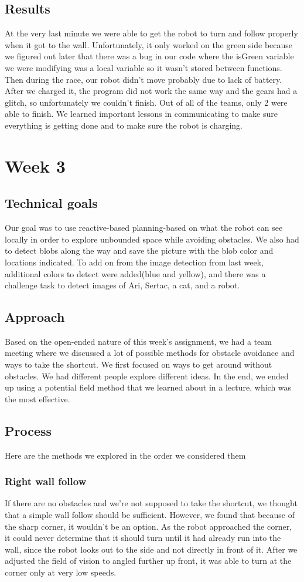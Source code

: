 \documentclass[journal, a4paper]{IEEEtran}
\begin{document}
\subsection{Results}
At the very last minute we were able to get the robot to turn and follow properly when it got to the wall. Unfortunately, it only worked on the green side because we figured out later that there was a bug in our code where the isGreen variable we were modifying was a local variable so it wasn't stored between functions. Then during the race, our robot didn’t move probably due to lack of battery. After we charged it, the program did not work the same way and the gears had a glitch, so unfortunately we couldn’t finish. Out of all of the teams, only 2 were able to finish. We learned important lessons in communicating to make sure everything is getting done and to make sure the robot is charging. 
\section{Week 3}
\subsection{Technical goals}
Our goal was to use reactive-based planning-based on what the robot can see locally in order to explore unbounded space while avoiding obstacles. We also had to detect blobs along the way and save the picture with the blob color and locations indicated. To add on from the image detection from last week, additional colors to detect were added(blue and yellow), and there was a challenge task to detect images of Ari, Sertac, a cat, and a robot. 
\subsection{Approach}
Based on the open-ended nature of this week’s assignment, we had a team meeting where we discussed a lot of possible methods for obstacle avoidance and ways to take the shortcut. We first focused on ways to get around without obstacles. We had different people explore different ideas. In the end, we ended up using a potential field method that we learned about in a lecture, which was the most effective.
\subsection{Process}
Here are the methods we explored in the order we considered them
\subsubsection{Right wall follow}
If there are no obstacles and we’re not supposed to take the shortcut, we thought that a simple wall follow should be sufficient. However, we found that because of the sharp corner, it wouldn’t be an option. As the robot approached the corner, it could never determine that it should turn until it had already run into the wall, since the robot looks out to the side and not directly in front of it. After we adjusted the field of vision to angled further up front, it was able to turn at the corner only at very low speeds. 
\end{document}
